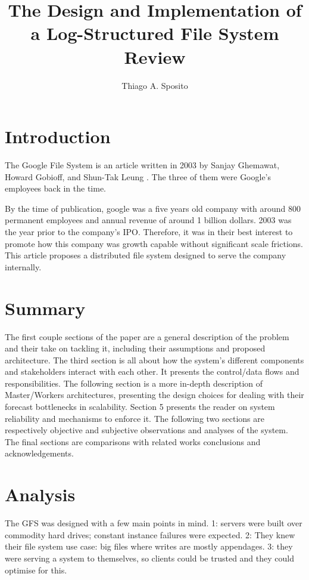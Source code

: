 \documentclass[12pt]{article}
\title{The Design and Implementation of a Log-Structured File System Review}
\author{Thiago A. Sposito\inst{1} }
\begin{document}
 

\maketitle


\section{Introduction}

The Google File System is an article written in 2003 by Sanjay Ghemawat, Howard Gobioff, and Shun-Tak Leung \cite{ghemawat2003google}. The three of them were Google's employees back in the time.

By the time of publication, google was a five years old company with around 800 permanent employees \cite{google_coorp_info} and annual revenue of around 1 billion dollars. 2003 was the year prior to the company's IPO\cite{katje_2020}. Therefore, it was in their best interest to promote how this company was growth capable without significant scale frictions. This article proposes a distributed file system designed to serve the company internally.

\section{Summary} 
The first couple sections of the paper are a general description of the problem and their take on tackling it, including their assumptions and proposed architecture. The third section is all about how the system's different components and stakeholders interact with each other. It presents the control/data flows and responsibilities. The following section is a more in-depth description of Master/Workers architectures, presenting the design choices for dealing with their forecast bottlenecks in scalability. Section 5 presents the reader on system reliability and mechanisms to enforce it. The following two sections are respectively objective and subjective observations and analyses of the system. The final sections are comparisons with related works conclusions and acknowledgements. 


\section{Analysis}
The GFS was designed with a few main points in mind. 1: servers were built over commodity hard drives; constant instance failures were expected. 2: They knew their file system use case: big files where writes are mostly appendages. 3: they were serving a system to themselves, so clients could be trusted and they could optimise for this.
\end{document}
